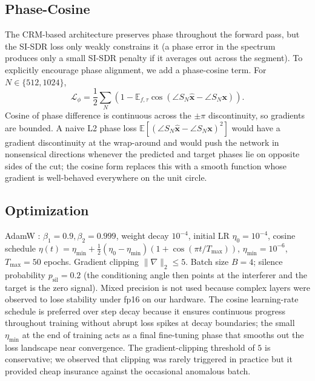 \documentclass[journal,10pt]{IEEEtran}
\newcommand{\E}{\mathbb{E}}
\newcommand{\bx}{\mathbf{x}}
\newcommand{\Lcal}{\mathcal{L}}
\begin{document}
\subsection{Phase-Cosine}
The CRM-based architecture preserves phase throughout the forward pass, but the SI-SDR loss only weakly constrains it (a phase error in the spectrum produces only a small SI-SDR penalty if it averages out across the segment). To explicitly encourage phase alignment, we add a phase-cosine term. For \(N\in\{512,1024\}\),
\begin{equation}
\Lcal_{\phi}=\frac{1}{2}\sum_{N}\!\left(1-\E_{f,\tau}\cos(\angle S_N\hat{\bx}-\angle S_N\bx)\right)\!.
\label{eq:phloss}
\end{equation}
Cosine of phase difference is continuous across the \(\pm\pi\) discontinuity, so gradients are bounded. A naive L2 phase loss \(\E[(\angle S_N\hat{\bx}-\angle S_N\bx)^2]\) would have a gradient discontinuity at the wrap-around and would push the network in nonsensical directions whenever the predicted and target phases lie on opposite sides of the cut; the cosine form replaces this with a smooth function whose gradient is well-behaved everywhere on the unit circle.

\subsection{Optimization}
AdamW \cite{loshchilov2017adamw}: \(\beta_1=0.9,\beta_2=0.999\), weight decay \(10^{-4}\), initial LR \(\eta_0=10^{-4}\), cosine schedule \(\eta(t)=\eta_{\min}+\tfrac{1}{2}(\eta_0-\eta_{\min})(1+\cos(\pi t/T_{\max}))\), \(\eta_{\min}=10^{-6}\), \(T_{\max}=50\) epochs. Gradient clipping \(\|\nabla\|_2\le 5\). Batch size \(B=4\); silence probability \(p_{\mathrm{sil}}=0.2\) (the conditioning angle then points at the interferer and the target is the zero signal). Mixed precision is not used because complex layers were observed to lose stability under fp16 on our hardware. The cosine learning-rate schedule is preferred over step decay because it ensures continuous progress throughout training without abrupt loss spikes at decay boundaries; the small \(\eta_{\min}\) at the end of training acts as a final fine-tuning phase that smooths out the loss landscape near convergence. The gradient-clipping threshold of \(5\) is conservative; we observed that clipping was rarely triggered in practice but it provided cheap insurance against the occasional anomalous batch.

\end{document}
